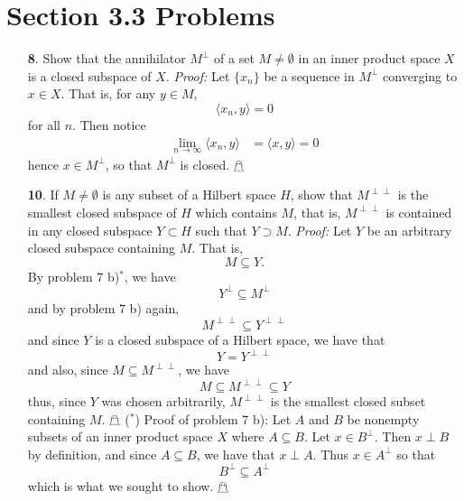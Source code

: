 \documentclass{article}
\begin{document}
\section*{Section 3.3 Problems}
\begin{itemize}
    \item[\textbf{8}.] Show that the annihilator $M^{\perp}$ of a set $M \neq \emptyset$ in an inner product space $X$ is a closed subspace of $X$. 
    \newline\newline
    \textit{Proof:} Let $\{x_n\}$ be a sequence in $M^{\perp}$ converging to $x \in X$. That is, for any $y \in M$,
    \[\langle x_n, y \rangle = 0\]
    for all $n$. Then notice
    \begin{align*}
        \lim_{n \to \infty} \langle x_n, y\rangle  &= \langle x, y\rangle = 0
    \end{align*}
    hence $x \in M^{\perp}$, so that $M^{\perp}$ is closed. \hfill $\mathghost$

    \item[\textbf{10}.] If $M \neq \emptyset$ is any subset of a Hilbert space $H$, show that $M^{\perp\perp}$ is the smallest closed subspace of $H$ which contains $M$, that is, $M^{\perp\perp}$ is contained in any closed subspace $Y \subset H$ such that $Y \supset M$.
    \newline\newline
    \textit{Proof:} Let $Y$ be an arbitrary closed subspace containing $M$. That is,
    \[M \subseteq Y.\]
    By problem 7 b)$^*$, we have 
    \[Y^{\perp} \subseteq M^{\perp}\]
    and by problem 7 b) again, 
    \[M^{\perp \perp} \subseteq Y^{\perp\perp}\]
    and since $Y$ is a closed subspace of a Hilbert space, we have that
    \[Y = Y^{\perp \perp}\]
    and also, since $M \subseteq M^{\perp\perp}$, we have
    \[M \subseteq M^{\perp\perp} \subseteq Y\]
    thus, since $Y$ was chosen arbitrarily, $M^{\perp\perp}$ is the smallest closed subset containing $M$. \hfill $\mathghost$
    \newline\newline
    ($^*$) Proof of problem 7 b): 
    \newline
    Let $A$ and $B$ be nonempty subsets of an inner product space $X$ where $A \subseteq B$. Let $x \in B^{\perp}$. Then $x \perp B$ by definition, and since $A \subseteq B$, we have that $x \perp A$. Thus $x \in A^{\perp}$ so that 
    \[B^{\perp} \subseteq A^{\perp}\]
    which is what we sought to show. \hfill $\mathghost$
\end{itemize}
\end{document}

